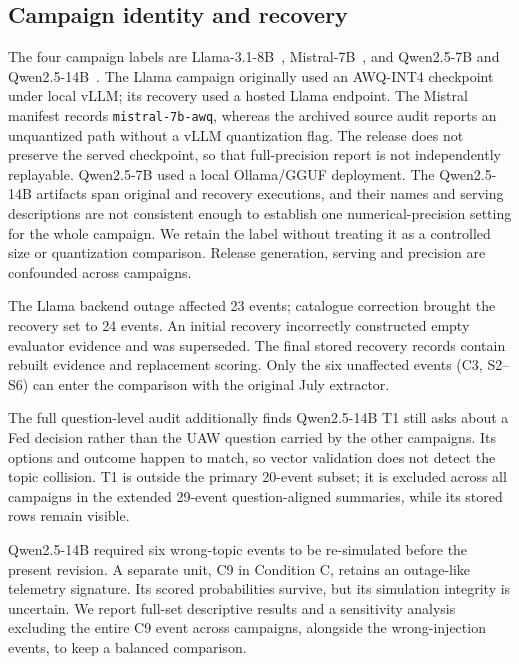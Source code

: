 \documentclass[10pt,conference]{IEEEtran}
\begin{document}
\subsection{Campaign identity and recovery}
The four campaign labels are Llama-3.1-8B~\cite{llama3,llama31card},
Mistral-7B~\cite{mistral7b,mistralcard}, and Qwen2.5-7B and
Qwen2.5-14B~\cite{qwen25,qwen25cards}. The Llama campaign originally used an
AWQ-INT4 checkpoint under local vLLM; its recovery used a hosted Llama endpoint.
The Mistral manifest records \texttt{mistral-7b-awq}, whereas the archived source
audit reports an unquantized path without a vLLM quantization flag. The release
does not preserve the served checkpoint, so that full-precision report is not
independently replayable. Qwen2.5-7B used a local Ollama/GGUF deployment.
The Qwen2.5-14B artifacts
span original and recovery executions, and their names and serving descriptions
are not consistent enough to establish one numerical-precision setting for
the whole campaign. We retain the label without treating it as a controlled
size or quantization comparison. Release generation, serving and precision
are confounded across campaigns.

The Llama backend outage affected 23 events; catalogue correction brought the
recovery set to 24 events. An initial recovery incorrectly constructed empty
evaluator evidence and was superseded. The final stored recovery records contain
rebuilt evidence and replacement scoring. Only the six unaffected events
(C3, S2--S6) can enter the comparison with the original July extractor.


The full question-level audit additionally finds Qwen2.5-14B T1 still asks
about a Fed decision rather than the UAW question carried by the other
campaigns. Its options and outcome happen to match, so vector validation
does not detect the topic collision. T1 is outside the primary 20-event
subset; it is excluded across all campaigns in the extended 29-event
question-aligned summaries, while its stored rows remain visible.

Qwen2.5-14B required six wrong-topic events to be re-simulated before the present
revision. A separate unit, C9 in Condition C, retains an outage-like telemetry
signature. Its scored probabilities survive, but its simulation integrity is
uncertain. We report full-set descriptive results and a sensitivity analysis
excluding the entire C9 event across campaigns, alongside the wrong-injection
events, to keep a balanced comparison.
\end{document}
